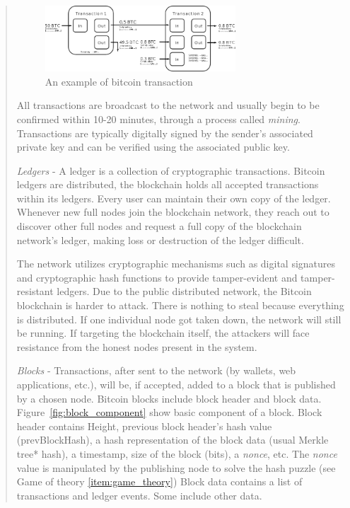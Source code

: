 \begin{itemize}
\begin{quote}
		      \begin{figure}[h!]
			      \centering
			      \includegraphics[width=0.7\textwidth]{images/transaction.png}
			      \caption[An example of bitcoin transaction]{An example of bitcoin transaction}
			      \label{fig:transaction}
		      \end{figure}
		      \bigbreak

		      All transactions are broadcast to the network and usually begin to be confirmed within 10-20 minutes, through a process called \emph{mining}.
		      Transactions are typically digitally signed by the sender’s associated private key and can be verified using the associated public key.

		      \bigbreak

		      \emph{Ledgers} -
		      A ledger is a collection of cryptographic transactions.
		      Bitcoin ledgers are distributed, the blockchain holds all accepted transactions within its ledgers. Every user can maintain their own copy of the ledger.
		      Whenever new full nodes join the blockchain network, they reach out to discover other full nodes and request a full copy of the blockchain network’s ledger, making loss or destruction of the ledger difficult.
		      \bigbreak

		      The network utilizes cryptographic mechanisms such as digital signatures and cryptographic hash functions to provide tamper-evident and tamper-resistant ledgers.
		      Due to the public distributed network, the Bitcoin blockchain is harder to attack. There is nothing to steal because everything is distributed. If one individual node got taken down, the network will still be running.
		      If targeting the blockchain itself, the attackers will face resistance from the honest nodes present in the system.
		      \bigbreak

		      \emph{Blocks} -
		      Transactions, after sent to the network (by wallets, web applications, etc.), will be, if accepted, added to a block that is published by a chosen node.
		      Bitcoin blocks include block header and block data.
		      Figure~\ref{fig:block_component} show basic component of a block.
		      Block header contains Height, previous block header’s hash value (prevBlockHash), a hash representation of the block data (usual Merkle tree* hash), a timestamp, size of the block (bits), a \emph{nonce}, etc.
		      The \emph{nonce} value is manipulated by the publishing node to solve the hash puzzle (see Game of theory \ref{item:game_theory})
		      Block data contains a list of transactions and ledger events. Some include other data.
		      \pagebreak


\end{quote}
\end{itemize}
